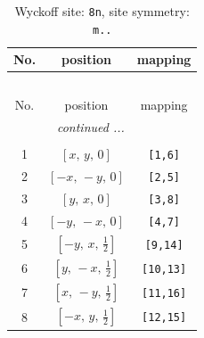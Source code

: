 \documentclass[fleqn,8pt]{jsarticle}
\begin{document}
\begin{longtable}{ccc}
\caption{Wyckoff site: {\tt 8n}, site symmetry: {\tt m..}}
 \\
 \hline \hline
No. & position & mapping \\ \hline \endfirsthead

\multicolumn{2}{l}{\tablename\ \thetable{}} \\
 \hline \hline
No. & position & mapping \\ \hline \endhead

 \hline \hline
\multicolumn{2}{r}{\footnotesize\it continued ...} \\ \endfoot

 \hline \hline
\multicolumn{2}{r}{} \\ \endlastfoot

1 & $\left[ x,\, y,\, 0 \right]$ & {\tt [1,6]} \\ \hline
2 & $\left[ - x,\, - y,\, 0 \right]$ & {\tt [2,5]} \\ \hline
3 & $\left[ y,\, x,\, 0 \right]$ & {\tt [3,8]} \\ \hline
4 & $\left[ - y,\, - x,\, 0 \right]$ & {\tt [4,7]} \\ \hline
5 & $\left[ - y,\, x,\, \frac{1}{2} \right]$ & {\tt [9,14]} \\ \hline
6 & $\left[ y,\, - x,\, \frac{1}{2} \right]$ & {\tt [10,13]} \\ \hline
7 & $\left[ x,\, - y,\, \frac{1}{2} \right]$ & {\tt [11,16]} \\ \hline
8 & $\left[ - x,\, y,\, \frac{1}{2} \right]$ & {\tt [12,15]} \\
\end{longtable}
\renewcommand{\arraystretch}{1.2}
\end{document}
